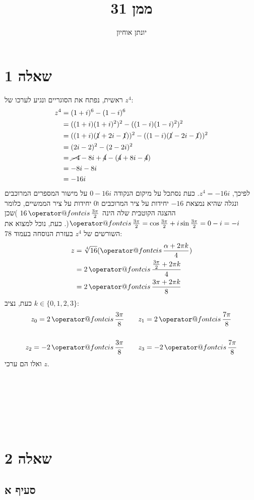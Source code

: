 \documentclass[11pt, oneside]{article}
\title{ממן 31}
\author{יונתן אוחיון}
\makeatletter
\newcommand{\qed}{\R{$\blacksquare$}}
\newcommand{\br}{\\\\\\\\\\\\\\}
\newcommand{\cis}[1]{\mathop{\operator@font cis}#1}
\makeatother
\begin{document}
\maketitle

\section{שאלה 1}
ראשית, נפתח את הסוגריים ונגיע לערכו של $z^4$:
\begin{align*}
z^4 & = (1 + i)^6 - (1 - i)^6\\
& = ((1 + i)(1 + i)^2)^2 - ((1 - i)(1 - i)^2)^2\\
& = ((1 + i)(\cancel{1} + 2i - \cancel{1}))^2 - ((1 - i)(\cancel{1} - 2i - \cancel{1}))^2\\
& = (2i - 2)^2 - (2 - 2i)^2\\
& = \cancel{-4} - 8i + \cancel{4} - (\cancel{4} + 8i - \cancel{4})\\
& = -8i - 8i\\
& = -16i
\end{align*}
\def\AT{\frac{3\pi}{2}}
לפיכך, $z^4 = -16i$. כעת נסתכל על מיקום הנקודה $0 - 16i$ על מישור המספרים המרוכבים ונגלה שהיא נמצאת $-16$ יחידות על ציר המרוכבים ו$0$ יחידות על ציר הממשיים, כלומר ההצגה הקוטבית שלה הינה $16\cis{\AT}$ )שכן $\cis{\AT} = \cos{\AT}+i\sin{\AT} = 0 - i = -i$(. כעת, נוכל למצוא את השורשים של $z^4$ בעזרת הנוסחה בעמוד 78:
\begin{align*}
z & = \sqrt[4]{16}(\cis{\frac{\alpha + 2 \pi k}{4}})\\
& = 2\cis{\frac{\AT + 2 \pi k}{4}}\\
& = 2\cis{\frac{3 \pi + 2 \pi k}{8}}
\end{align*}
כעת, נציב $k \in \{0, 1, 2, 3\}$:
\begin{align*}
z_0 = 2\cis{\frac{3\pi}{8}} \quad&\quad z_1 = 2\cis{\frac{7\pi}{8}}\\\\
z_2 = -2\cis{\frac{3\pi}{8}} \quad&\quad z_3 = -2\cis{\frac{7\pi}{8}}
\end{align*}
ואלו הם ערכי $z$.
\br\qed
\clearpage

\section{שאלה 2}
\subsection{סעיף א}
\end{document}
